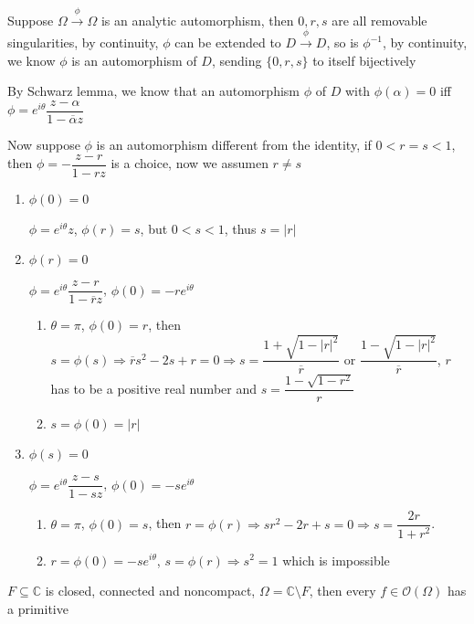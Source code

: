 \documentclass[main]{subfiles}
\begin{document}
\begin{solution}
Suppose $\Omega\xrightarrow\phi\Omega$ is an analytic automorphism, then $0,r,s$ are all removable singularities, by continuity, $\phi$ can be extended to $D\xrightarrow\phi D$, so is $\phi^{-1}$, by continuity, we know $\phi$ is an automorphism of $D$, sending $\{0,r,s\}$ to itself bijectively \par
By Schwarz lemma, we know that an automorphism $\phi$ of $D$ with $\phi(\alpha)=0$ iff $\phi=e^{i\theta}\dfrac{z-\alpha}{1-\overline\alpha z}$ \par
Now suppose $\phi$ is an automorphism different from the identity, if $0<r=s<1$, then $\phi=-\dfrac{z-r}{1-rz}$ is a choice, now we assumen $r\neq s$
\begin{enumerate}[{label=\textbf{Case \Roman*:}}, leftmargin=*, align=left]
\item $\phi(0)=0$ \par
$\phi=e^{i\theta}z$, $\phi(r)=s$, but $0<s<1$, thus $s=|r|$
\item $\phi(r)=0$ \par
$\phi=e^{i\theta}\dfrac{z-r}{1-\overline r z}$, $\phi(0)=-re^{i\theta}$
\begin{enumerate}[{label=\textbf{Case \roman*:}}, leftmargin=*, align=left]
\item $\theta=\pi$, $\phi(0)=r$, then $s=\phi(s)\Rightarrow \overline rs^2-2s+r=0\Rightarrow s=\dfrac{1+\sqrt{1-|r|^2}}{\overline r}\text{ or }\dfrac{1-\sqrt{1-|r|^2}}{\overline r}$, $r$ has to be a positive real number and $s=\dfrac{1-\sqrt{1-r^2}}{r}$
\item $s=\phi(0)=|r|$
\end{enumerate}
\item $\phi(s)=0$ \par
$\phi=e^{i\theta}\dfrac{z-s}{1-sz}$, $\phi(0)=-se^{i\theta}$
\begin{enumerate}[{label=\textbf{Case \roman*:}}, leftmargin=*, align=left]
\item $\theta=\pi$, $\phi(0)=s$, then $r=\phi(r)\Rightarrow sr^2-2r+s=0\Rightarrow s=\dfrac{2r}{1+r^2}$.
\item $r=\phi(0)=-se^{i\theta}$, $s=\phi(r)\Rightarrow s^2=1$ which is impossible
\end{enumerate}
\end{enumerate}
\end{solution}

\begin{exercise}
$F\subseteq\mathbb C$ is closed, connected and noncompact, $\Omega=\mathbb C\setminus F$, then every $f\in\mathcal O(\Omega)$ has a primitive
\end{exercise}
\end{document}
